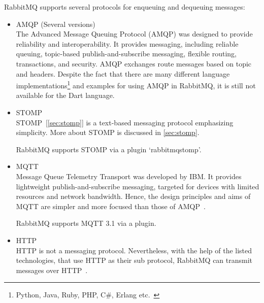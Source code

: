 RabbitMQ supports several protocols for enqueuing and dequeuing messages:
\begin{itemize}
  \item AMQP (Several versions)\\
  The Advanced Message Queuing Protocol (AMQP) was designed to provide reliability and interoperability. It provides messaging, including reliable queuing, topic-based publish-and-subscribe messaging, flexible routing, transactions, and security. AMQP exchanges route messages based on topic and headers\cite{andyPiperVmware}.
  Despite the fact that there are many different language implementations\footnote{Python, Java, Ruby, PHP, C\#, Erlang etc.~\cite{rabbitmqGetstarted}} and examples for using AMQP in RabbitMQ, it is still not available for the Dart language.

  \item STOMP\\
  STOMP~[\autoref{sec:stomp}] is a text-based messaging protocol emphasizing simplicity. More about STOMP is discussed in \autoref{sec:stomp}.

  RabbitMQ supports STOMP via a plugin \textendash{} ‘rabbitmq\textunderscore{}stomp’.

  \item MQTT\\
  Message Queue Telemetry Transport was developed by IBM. It provides lightweight publish-and-subscribe messaging, targeted for devices with limited resources and network bandwidth. Hence, the design principles and aims of MQTT are simpler and more focused than those of AMQP~\cite{andyPiperVmware}.

  RabbitMQ supports MQTT 3.1 via a plugin.
  \item HTTP\\
  HTTP is not a messaging protocol. Nevertheless, with the help of the listed technologies, that use HTTP as their sub protocol, RabbitMQ can transmit messages over HTTP~\cite{rabbitmqProtocols}.

\end{itemize}

